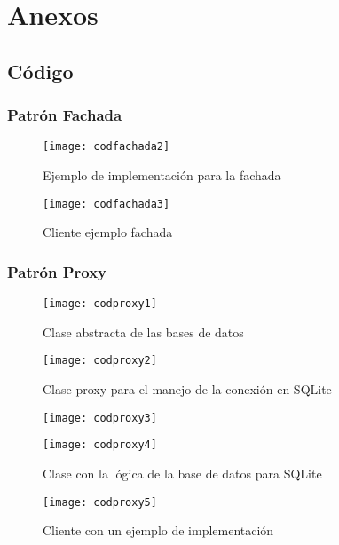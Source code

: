 \chapter{Anexos}
\section{Código}
\subsection{Patrón Fachada}
\clearpage
\begin{figure}[H]
	\centering
	\texttt{[image: codfachada2]}
	\centering
	\caption{Ejemplo de implementación para la fachada}
	\label{fig:codfachada2}
\end{figure}
\begin{figure}[H]
	\centering
	\texttt{[image: codfachada3]}
	\centering
	\caption{Cliente ejemplo fachada}
	\label{fig:codfachada3}
\end{figure}
\subsection{Patrón Proxy}
\begin{figure}[H]
	\centering
	\texttt{[image: codproxy1]}
	\centering
	\caption{Clase abstracta de las bases de datos}
	\label{fig:codproxy1}
\end{figure}
\clearpage
\begin{figure}[H]
	\centering
	\texttt{[image: codproxy2]}
	\centering
	\caption{Clase proxy para el manejo de la conexión en SQLite}
	\label{fig:codproxy2}
\end{figure}
\begin{figure}[H]
	\centering
	\texttt{[image: codproxy3]}
	\centering
	\label{fig:codproxy3}
\end{figure}
\begin{figure}[H]

	\texttt{[image: codproxy4]}
	\caption{Clase con la lógica de la base de datos para SQLite}

\end{figure}
\begin{figure}[H]
	\centering
	\texttt{[image: codproxy5]}
	\centering
		\caption{Cliente con un ejemplo de implementación}
	\label{fig:codproxy5}
\end{figure}

